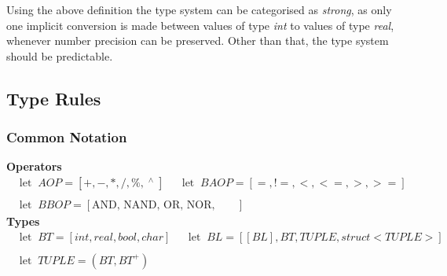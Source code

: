 Using the above definition the type system can be categorised as \emph{strong}, as only one implicit conversion is made between values of type \emph{int} to values of type \emph{real}, whenever number precision can be preserved. Other than that, the type system should be predictable.



\subsection{Type Rules}

\subsubsection{Common Notation}
\textbf{Operators}
\begin{align*}
&\textrm{let} \;\; AOP = [+, -, *, /, \%, \;^\wedge{} \;]
&
&\textrm{let} \;\; BAOP = [=, !=, <, <=, >, >=]
\\\\
&\textrm{let} \;\; BBOP = [\textrm{AND, NAND, OR, NOR, XOR}]
\end{align*}
\textbf{Types}
\begin{align*}
&\textrm{let} \;\; BT = [int, real, bool, char]
&
&\textrm{let} \;\; BL = [[BL], BT, TUPLE, struct<TUPLE>]
\\\\
&\textrm{let} \;\; TUPLE = (BT, BT^+)
\end{align*}
